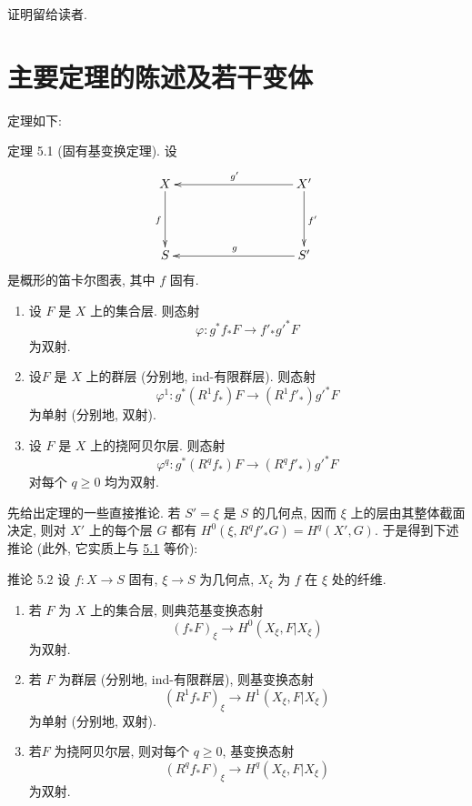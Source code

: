 证明留给读者.

\section{主要定理的陈述及若干变体}

定理如下:

\begin{enonce*}{定理 5.1}
(固有基变换定理). 设
$$
\xymatrix@C=3.25cm@R=1.5cm{
X \ar[d]_{f} & X' \ar[l]_{g'} \ar[d]^{f'}\\
S & S' \ar[l]_{g}
}
$$
是概形的笛卡尔图表, 其中 $f$ 固有.
\begin{enumerate}
\renewcommand{\theenumi}{\roman{enumi}}
\renewcommand{\labelenumi}{(\theenumi)}
\item 设 $F$ 是 $X$ 上的集合层. 则态射 
$$
\varphi:g^{\ast}f_{\ast}F\longrightarrow {f'}_{\ast}{g'}^{\ast}F
$$
为双射.

\item 设\pageoriginale $F$ 是 $X$ 上的群层 (分别地, ind-有限群层). 则态射 
$$
\varphi^1:g^{\ast}(R^1f_{\ast})F\longrightarrow
(R^1{f'}_{\ast}){g'}^{\ast}F
$$
为单射 (分别地, 双射).

\item 设 $F$ 是 $X$ 上的挠阿贝尔层. 则态射 
$$
\varphi^q:g^{\ast}(R^qf_{\ast})F\longrightarrow
(R^q{f'}_{\ast}){g'}^{\ast}F
$$
对每个 $q\geq0$ 均为双射.
\end{enumerate}
\end{enonce*}

先给出定理的一些直接推论. 若 $S'=\xi$ 是 $S$ 的几何点, 因而 $\xi$ 上的层由其整体截面决定, 则对 $X'$ 上的每个层 $G$ 都有 $H^0(\xi,R^q{f'}_{\ast}G)=H^q(X',G)$. 于是得到下述推论 (此外, 它实质上与 \hyperref[XII.thm5.1]{5.1} 等价):

\begin{enonce*}{推论 5.2}
设 $f:X\longrightarrow S$ 固有, $\xi\longrightarrow S$ 为几何点, $X_{\xi}$ 为 $f$ 在 $\xi$ 处的纤维.
\begin{enumerate}
\renewcommand{\theenumi}{\roman{enumi}}
\renewcommand{\labelenumi}{(\theenumi)}
\item 若 $F$ 为 $X$ 上的集合层, 则典范基变换态射
$$
(f_{\ast}F)_{\xi}\longrightarrow H^0(X_{\xi},F|X_{\xi})
$$
为双射.

\item 若 $F$ 为群层 (分别地, ind-有限群层), 则基变换态射
$$
(R^1f_{\ast}F)_{\xi}\longrightarrow H^1(X_{\xi},F|X_{\xi})
$$
为单射 (分别地, 双射).

\item 若\pageoriginale $F$ 为挠阿贝尔层, 则对每个 $q\geq0$, 基变换态射
$$
(R^qf_{\ast}F)_{\xi}\longrightarrow H^q(X_{\xi},F|X_{\xi})
$$
为双射.
\end{enumerate}
\end{enonce*}

